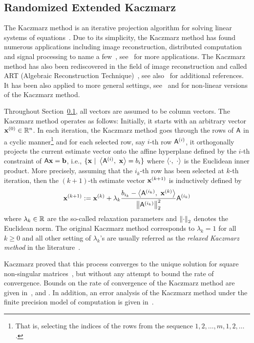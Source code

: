 \subsection{Randomized Extended Kaczmarz}\label{sec:REK}
%
%
The Kaczmarz method is an iterative projection algorithm for solving linear systems of equations~\cite{K}. Due to its simplicity, the Kaczmarz method has found numerous applications including image reconstruction, distributed computation and signal processing to name a few~\cite{K:apps:CFM92,book:K:apps:H80,book:K:apps:Nat01,CDC12}, see~\cite{K:apps} for more applications. The Kaczmarz method has also been rediscovered in the field of image reconstruction and called ART (Algebraic Reconstruction Technique)~\cite{ART}, see also~\cite{book:Zenios,book:K:apps:H80} for additional references. It has been also applied to more general settings, see~\cite[Table~1]{K:apps} and \cite{K:tompk,K:rate:MC77} for non-linear versions of the Kaczmarz method.

Throughout Section~\ref{sec:REK}, all vectors are assumed to be column vectors. The Kaczmarz method operates as follows: Initially, it starts with an arbitrary vector $\mathbf{x}^{(0)}\in\mathbb{R}^n$. In each iteration, the Kaczmarz method goes through the rows of ${\mathsf{A} }$ in a cyclic manner\footnote{That is, selecting the indices of the rows from the sequence $1,2,\ldots , m , 1,2 , \ldots$.} and for each selected row, say $i$-th row ${\mathsf{A} }^{(i)}$, it orthogonally projects the current estimate vector onto the affine hyperplane defined by the $i$-th constraint of ${\mathsf{A} }\mathbf{x} = {\mathbf b}$, i.e., $\{\mathbf{x}\ |\ \left\langle {  {\ensuremath{\mathsf{A} }}^{(i)}},\ {\mathbf{x}} \right\rangle = b_i\}$ where $\left\langle {\cdot},\ {\cdot} \right\rangle$  is the Euclidean inner product. More precisely, assuming that the $i_k$-th row has been selected at $k$-th iteration, then the $(k+1)$-th estimate vector $\mathbf{x}^{(k+1)}$ is inductively defined by
\[\mathbf{x}^{(k+1)} := \mathbf{x}^{(k)} + \lambda_k\frac{b_{i_k} - \left\langle {  {\ensuremath{\mathsf{A} }}^{(i_k)}},\ { \mathbf{x}^{(k)}} \right\rangle}{\left\|{\mathsf{A} }^{(i_k)}\right\|_2^2} {\mathsf{A} }^{(i_k)}\]
where $\lambda_k \in \mathbb{R}$ are the so-called relaxation parameters and $\left\|\cdot\right\|_2$ denotes the Euclidean norm. The original Kaczmarz method corresponds to $\lambda_k = 1$ for all $k\geq 0$ and all other setting of $\lambda_k$'s are usually referred as the \emph{relaxed Kaczmarz method} in the literature~\cite{K:apps,book:Galantai}.

Kaczmarz proved that this process converges to the unique solution for square non-singular matrices~\cite{K}, but without any attempt to bound the rate of convergence. Bounds on the rate of convergence of the Kaczmarz method are given in~\cite{K:rate:MC77}, \cite{K:rate:Ansorge} and \cite[Theorem~4.4, p.120]{book:Galantai}. In addition, an error analysis of the Kaczmarz method under the finite precision model of computation is given in~\cite{phdthesis:K:error,K:error}.
%

